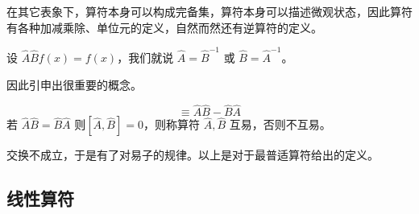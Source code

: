 % 



在其它表象下，算符本身可以构成完备集，算符本身可以描述微观状态，因此算符有各种加减乘除、单位元的定义，自然而然还有逆算符的定义。

\begin{theorem}[逆算符]
    设 $\hat A\hat B f(x) = f(x)$，我们就说 $\hat A = \hat B^{-1}$ 或 $\hat B = \hat A^{-1}$。
\end{theorem}

因此引申出很重要的概念。

\begin{theorem}[对易]
    \begin{equation}
        [\hat A, \hat B] \equiv \hat A \hat B -\hat B \hat A
    \end{equation}
    若 $\hat A \hat B = \hat B \hat A$ 则$[\hat A,\hat B] = 0$，则称算符 $\hat A, \hat B$ 互易，否则不互易。
\end{theorem}


交换不成立，于是有了对易子的规律。以上是对于最普适算符给出的定义。

\subsection{线性算符}

